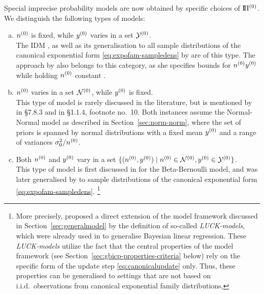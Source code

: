 Special imprecise probability models are now obtained by specific choices of $\text{I}\!\Pi^{(0)}$.
We distinguish the following types of models:
\begin{enumerate}[(a)]
\item $n^{(0)}$ is fixed, while $y^{(0)}$ varies in a set $\mathcal{Y}^{(0)}$.\\
\label{enum:modeltypes-a}%
The IDM \parencite{1996:walley::idm},
as well as its generalisation to all sample distributions of the canonical exponential form \eqref{eq:expofam-sampledens}
by \textcite{2005:quaeghebeurcooman} are of this type.
The approach by \textcite{1997:boratynska} also belongs to this category,
as she specifies bounds for $n^{(0)} y^{(0)}$ while holding $n^{(0)}$ constant \parencite[see][p.~1973]{2012:benavolizaffalon}.
\item $n^{(0)}$ varies in a set $\mathcal{N}^{(0)}$, while $y^{(0)}$ is fixed.\\
\label{enum:varyn}%
This type of model is rarely discussed in the literature,
but is mentioned by \textcite{1991:walley} in {\S 7.8.3} and in {\S 1.1.4}, footnote no.~10.
Both instances assume the Normal-Normal model as described in Section~\ref{sec:norm-norm},
where the set of priors is spanned by normal distributions with a fixed mean $y^{(0)}$ and a range of variances $\sigma_0^2 / n^{(0)}$.
\item Both $n^{(0)}$ and $y^{(0)}$ vary in a set $\{ (n^{(0)}, y^{(0)}) \mid n^{(0)} \in \mathcal{N}^{(0)}, y^{(0)} \in \mathcal{Y}^{(0)} \}$.\\
\label{enum:rectangular}%
This type of model is first discussed in \textcite[\S 5.4.3]{1991:walley} for the Beta-Bernoulli model,
and was later generalised by \textcite{Walter2009a}
to sample distributions of the canonical exponential form \eqref{eq:expofam-sampledens}.%
\footnote{\label{foot:luckmodels}%
More precisely, \textcite[see Section~\ref{sec:jstp}]{Walter2009a} proposed
a direct extension of the model framework discussed in Section~\ref{sec:generalmodel}
by the definition of so-called \emph{LUCK-models},
which were already used in \textcite{Walter2007a}
to generalise Bayesian linear regression. %
These \emph{LUCK-models} utilize the fact that the central properties of the model framework
(see Section~\ref{sec:gbicp-properties-criteria} below)
rely on the specific form of the update step \eqref{eq:canonicalupdate} only.
Thus, these properties can be generalised to settings
that are not based on i.i.d.\ observations from canonical exponential family distributions,
}
\end{enumerate}
